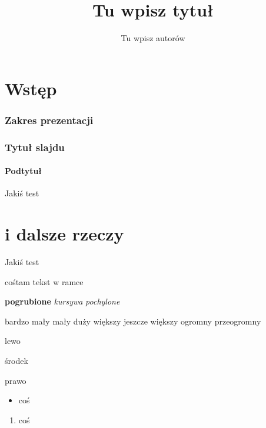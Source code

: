 \documentclass[a4paper]{beamer}
\title{Tu wpisz tytuł}
\author{Tu wpisz autorów}
\date{}
\begin{document}
\section{Wstęp}

\begin{frame}
\titlepage
\end{frame}

\begin{frame}
\frametitle{Zakres prezentacji}
\tableofcontents
\end{frame}

\begin{frame}
\frametitle{Tytuł slajdu}
\framesubtitle{Podtytuł}
Jakiś test
\end{frame}

\section{i dalsze rzeczy}

\begin{frame}
\begin{center}
Jakiś test
\end{center}
\end{frame}

\begin{frame}
\begin{block}{cośtam}
tekst w ramce
\end{block}
\end{frame}

\begin{frame}
\textbf{pogrubione} \textit{kursywa} \textsl{pochylone}

{\tiny bardzo mały} {\small mały} {\large duży} {\Large większy} {\LARGE jeszcze większy} {\huge ogromny} {\Huge przeogromny}

\begin{flushleft}
lewo
\end{flushleft}
\begin{center}
środek
\end{center}
\begin{flushright}
prawo
\end{flushright}
\begin{itemize}
\item coś
\end{itemize}
\begin{enumerate}
\item coś
\end{enumerate}
\end{frame}
\end{document}
